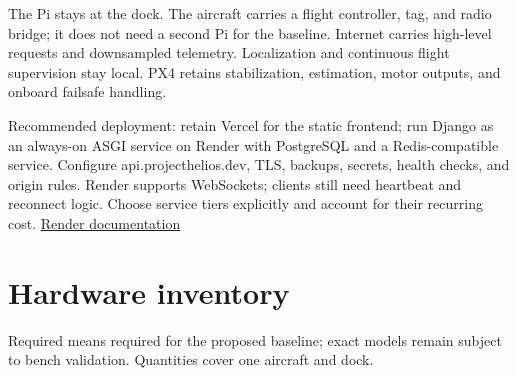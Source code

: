 \documentclass[10pt,letterpaper]{article}
\begin{document}
The Pi stays at the dock. The aircraft carries a flight controller, tag, and radio bridge; it does not need a second Pi for the baseline. Internet carries high-level requests and downsampled telemetry. Localization and continuous flight supervision stay local. PX4 retains stabilization, estimation, motor outputs, and onboard failsafe handling.

Recommended deployment: retain Vercel for the static frontend; run Django as an always-on ASGI service on Render with PostgreSQL and a Redis-compatible service. Configure api.projecthelios.dev, TLS, backups, secrets, health checks, and origin rules. Render supports WebSockets; clients still need heartbeat and reconnect logic. Choose service tiers explicitly and account for their recurring cost. \href{https://render.com/docs/websocket}{Render documentation}

\section{Hardware inventory}
Required means required for the proposed baseline; exact models remain subject to bench validation. Quantities cover one aircraft and dock.
\end{document}
